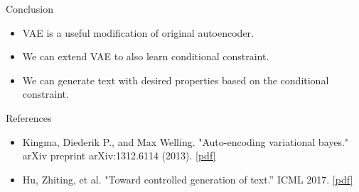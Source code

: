 \documentclass{beamer}
\begin{document}
    \begin{frame}{Conclusion}
        \begin{itemize}
            \item VAE is a useful modification of original autoencoder.
            \item We can extend VAE to also learn conditional constraint.
            \item We can generate text with desired properties based on the conditional constraint.
        \end{itemize}
    \end{frame}

    \begin{frame}{References}

        \begin{itemize}
            \item Kingma, Diederik P., and Max Welling. "Auto-encoding variational bayes." arXiv preprint arXiv:1312.6114 (2013). \href{https://arxiv.org/abs/1312.6114}{[pdf]}
            \item Hu, Zhiting, et al. "Toward controlled generation of text.” ICML 2017. \href{http://proceedings.mlr.press/v70/hu17e/hu17e.pdf}{[pdf]}
        \end{itemize}
    \end{frame}
\end{document}
